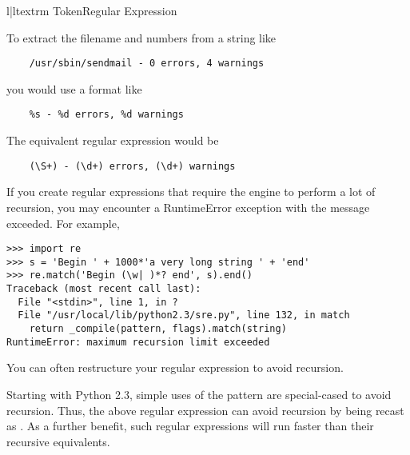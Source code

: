 \begin{tableii}{l|l}{textrm}{ Token}{Regular Expression}
         {}
         {}
         {}
         {}
         {}
         {}
         {}
         {}
         {}
\end{tableii}

To extract the filename and numbers from a string like

\begin{verbatim}
    /usr/sbin/sendmail - 0 errors, 4 warnings
\end{verbatim}

you would use a  format like

\begin{verbatim}
    %s - %d errors, %d warnings
\end{verbatim}

The equivalent regular expression would be

\begin{verbatim}
    (\S+) - (\d+) errors, (\d+) warnings
\end{verbatim}


If you create regular expressions that require the engine to perform a
lot of recursion, you may encounter a RuntimeError exception with
the message  exceeded. For example,

\begin{verbatim}
>>> import re
>>> s = 'Begin ' + 1000*'a very long string ' + 'end'
>>> re.match('Begin (\w| )*? end', s).end()
Traceback (most recent call last):
  File "<stdin>", line 1, in ?
  File "/usr/local/lib/python2.3/sre.py", line 132, in match
    return _compile(pattern, flags).match(string)
RuntimeError: maximum recursion limit exceeded
\end{verbatim}

You can often restructure your regular expression to avoid recursion.

Starting with Python 2.3, simple uses of the  pattern are
special-cased to avoid recursion.  Thus, the above regular expression
can avoid recursion by being recast as
.  As a further benefit, such regular
expressions will run faster than their recursive equivalents.
